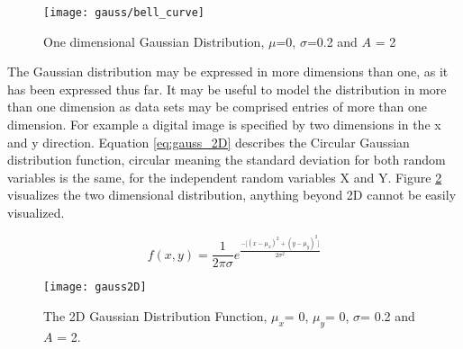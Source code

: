 \begin{figure}[H]
  \centering
  \centering\texttt{[image: gauss/bell\_curve]}
  \caption{One dimensional Gaussian Distribution, $\mu$=0, $\sigma$=0.2 and $A$ = 2}
  \label{fig:gauss}
\end{figure}

The Gaussian distribution may be expressed in more dimensions than one, as it has been expressed thus far. It may be useful to model the distribution in more than one dimension as data sets may be comprised entries of more than one dimension. For example a digital image is specified by two dimensions in the x and y direction. Equation \ref{eq:gauss_2D} describes the Circular Gaussian distribution function, circular meaning the standard deviation for both random variables is the same, for the independent random variables X and Y. Figure \ref{fig:gauss_2D} visualizes the two dimensional distribution, anything beyond 2D cannot be easily visualized. 

\begin{equation}
f(x,y) = \frac{1}{2\pi\sigma}e^\frac{{-\big[(x-\mu_x)^2 + (y-\mu_y)^2\big]}}{2\sigma^2}
\label{eq:gauss_2D}
\end{equation}

\begin{figure}[H]
  \centering
  \centering\texttt{[image: gauss2D]}
  \caption{The 2D Gaussian Distribution Function, $\mu_x$= 0, $\mu_y$= 0, $\sigma$= 0.2 and $A$ = 2.}
  \label{fig:gauss_2D}
\end{figure}







  
  
